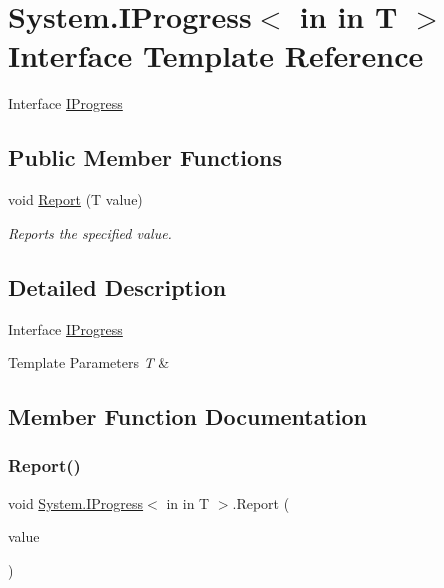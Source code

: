 \hypertarget{interface_system_1_1_i_progress}{}\section{System.\+I\+Progress$<$ in in T $>$ Interface Template Reference}
\label{interface_system_1_1_i_progress}


Interface \hyperlink{interface_system_1_1_i_progress}{I\+Progress}  


\subsection*{Public Member Functions}
\begin{DoxyCompactItemize}
\item 
void \hyperlink{interface_system_1_1_i_progress_a5ddfc2ac025b1df2dfe8b6d6c0cfd5cc}{Report} (T value)
\begin{DoxyCompactList}\small\item\em Reports the specified value. \end{DoxyCompactList}\end{DoxyCompactItemize}


\subsection{Detailed Description}
Interface \hyperlink{interface_system_1_1_i_progress}{I\+Progress} 


\begin{DoxyTemplParams}{Template Parameters}
{\em T} & \\
\hline
\end{DoxyTemplParams}


\subsection{Member Function Documentation}
\mbox{\label{interface_system_1_1_i_progress_a5ddfc2ac025b1df2dfe8b6d6c0cfd5cc}} 
\subsubsection{\texorpdfstring{Report()}{Report()}}
{\footnotesize\ttfamily void \hyperlink{interface_system_1_1_i_progress}{System.\+I\+Progress}$<$ in in T $>$.Report (\begin{DoxyParamCaption}\item[{T}]{value }\end{DoxyParamCaption})}



